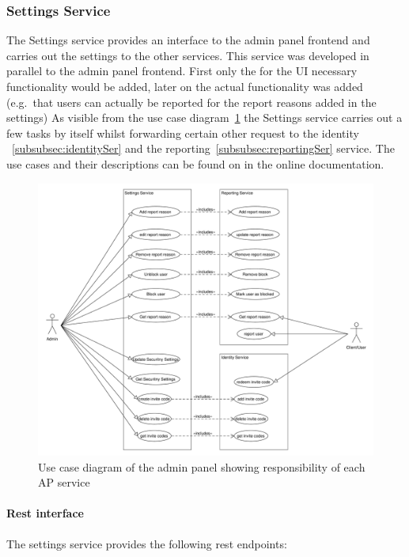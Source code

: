 \subsubsection{Settings Service}
\label{subsubsec:settingsSer}
The Settings service provides an interface to the admin panel frontend and carries out the settings to the other services.
This service was developed in parallel to the admin panel frontend. %
First only the for the UI necessary functionality would be added, later on the actual functionality was added (e.g.\ that users can actually be reported for the report reasons added in the settings)
As visible from the use case diagram~\ref{fig:ucd} the Settings service carries out a few tasks by itself whilst forwarding
certain other request to the identity ~\ref{subsubsec:identitySer} and the reporting~\ref{subsubsec:reportingSer} service.
The use cases and their descriptions can be found on in the online documentation.

\begin{figure}[!ht]
    \centering
    \includegraphics[width=1.0\textwidth]{./images/UseCaseDiagramAdminPanel.pdf}
    \caption{Use case diagram of the admin panel showing responsibility of each AP service}
    \label{fig:ucd}
\end{figure}

\paragraph{Rest interface}
The settings service provides the following rest endpoints:


